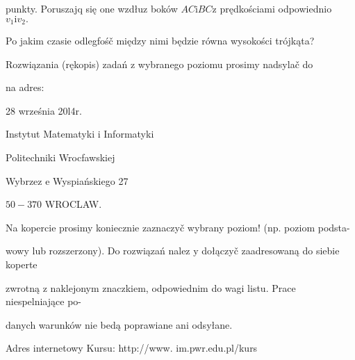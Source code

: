 \documentclass[a4paper,12pt]{article}
\begin{document}
punkty. Poruszajq się one wzdłuz boków $AC\mathrm{i}BC\mathrm{z}$ prędkościami odpowiednio $v_{1}\mathrm{i}v_{2}.$

Po jakim czasie odlegfośč między nimi będzie równa wysokości trójkąta?

Rozwiązania (rękopis) zadań z wybranego poziomu prosimy nadsylač do

na adres:

28 września 20l4r.

Instytut Matematyki $\mathrm{i}$ Informatyki

Politechniki Wrocfawskiej

Wybrzez $\mathrm{e}$ Wyspiańskiego 27

$50-370$ WROCLAW.

Na kopercie prosimy koniecznie zaznaczyč wybrany poziom! (np. poziom podsta-

wowy lub rozszerzony). Do rozwiązań nalez $\mathrm{y}$ dołączyč zaadresowaną do siebie koperte

zwrotną $\mathrm{z}$ naklejonym znaczkiem, odpowiednim do wagi listu. Prace niespelniające po-

danych warunków nie bedą poprawiane ani odsyłane.

Adres internetowy Kursu: http://www. im.pwr.edu.pl/kurs
\end{document}
